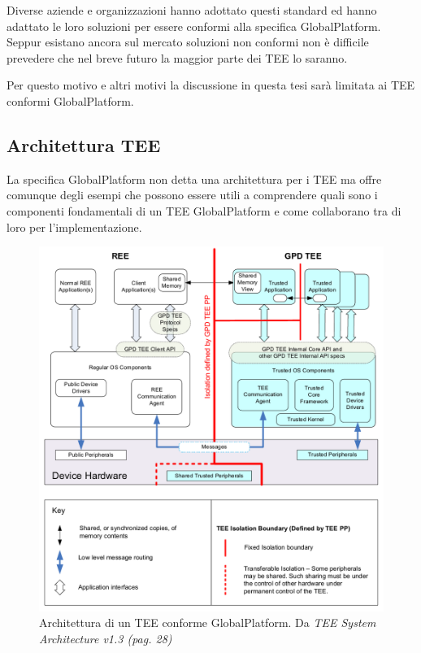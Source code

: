 \documentclass[12pt,italian]{report}
\begin{document}
Diverse aziende e organizzazioni hanno adottato questi standard
ed hanno adattato le loro soluzioni per essere conformi alla specifica
GlobalPlatform.
Seppur esistano ancora sul mercato soluzioni non conformi non è difficile
prevedere che nel breve futuro la maggior parte dei TEE lo saranno.

Per questo motivo e altri motivi la discussione in questa tesi sarà limitata
ai TEE conformi GlobalPlatform.

\subsection{Architettura TEE}
\label{subsec:architettura-tee}

La specifica GlobalPlatform non detta una architettura per i TEE ma offre
comunque degli esempi che possono essere utili a comprendere quali sono
i componenti fondamentali di un TEE GlobalPlatform e come collaborano
tra di loro per l'implementazione.

\begin{figure}
    \centering
    \includegraphics[width=1\textwidth]{immagini/tee-system-architecture}
    \caption{
        Architettura di un TEE conforme GlobalPlatform. 
        Da \textit{TEE System Architecture v1.3 (pag. 28)}
        \cite{gp2020systemarchitecture}
    }
    \label{fig:tee-system-architecture}
\end{figure}
\end{document}
